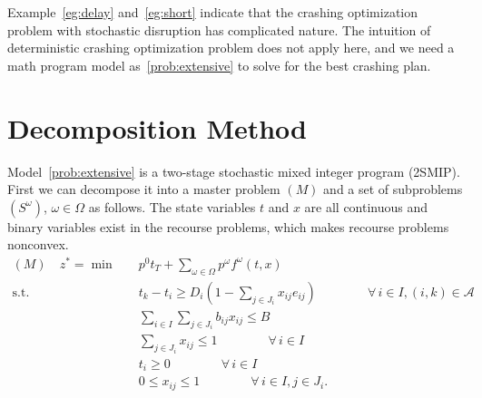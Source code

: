 \documentclass[11pt]{article}
\newcommand{\noi}{\noindent}
\begin{document}
	\noi Example~\ref{eg:delay} and~\ref{eg:short} indicate that the crashing optimization problem with stochastic disruption has complicated nature. The intuition of deterministic crashing optimization problem does not apply here, and we need a math program model as~\eqref{prob:extensive} to solve for the best crashing plan.
	
	\section{Decomposition Method} \label{sec:decomposition}
	Model~\eqref{prob:extensive} is a two-stage stochastic mixed integer program (2SMIP). First we can decompose it into a master problem \((M)\) and a set of subproblems \((S^\omega)\), \(\omega \in \Omega\) as follows. The state variables \(t\) and \(x\) are all continuous and binary variables exist in the recourse problems, which makes recourse problems nonconvex. 
	\begin{subequations}
		\label{prob:masterOri}
		\begin{align}
		(M) \quad z^* = \min \quad &p^0 t_T + \sum_{\omega \in \Omega} p^\omega f^\omega(t,x)\\
		\text{s.t.} \quad & t_k - t_i \geq D_{i}(1 - \sum_{j \in J_i} x_{ij} e_{ij}) \qquad \qquad \forall \,i \in I, (i,k) \in \mathcal{A} \label{cons:MSep}\\
		& \sum_{i \in I} \sum_{j \in J_i} b_{ij}x_{ij} \leq B  \label{cons:MBudget}\\
		& \sum_{j \in J_i} x_{ij} \leq 1  \qquad \qquad \forall \,i \in I \label{cons:MSingleBudget}\\
		& t_i \geq 0 \qquad \qquad \forall \,i \in I\\
		& 0 \leq x_{ij} \leq 1 \qquad \qquad \forall \,i \in I, j \in J_i.
		\end{align}
	\end{subequations}
\end{document}

